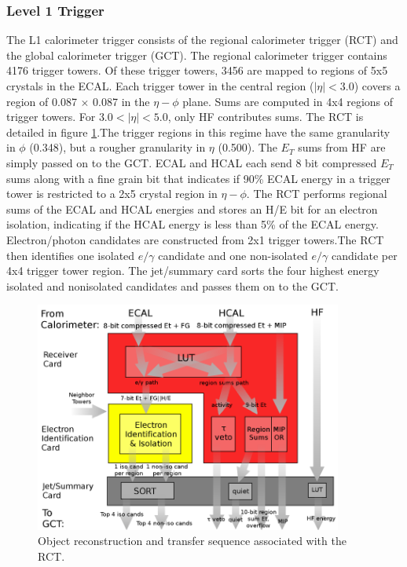 \documentclass[oneside, letterpaper, oldfontcommands]{memoir}
\begin{document}
\subsubsection{Level 1 Trigger}\label{L1trig}

\qquad The L1 calorimeter trigger consists of the regional calorimeter trigger (RCT) and the global calorimeter trigger (GCT). The regional calorimeter trigger contains 4176 trigger towers. Of these trigger towers, 3456 are mapped to regions of 5x5 crystals in the ECAL. Each trigger tower in the central region ($|\eta| < 3.0$) covers a region of 0.087 $\times$ 0.087 in the $\eta - \phi$ plane. Sums are computed in 4x4 regions of trigger towers. For $3.0 < |\eta| < 5.0$, only HF contributes sums. The RCT is detailed in figure \ref{fig:rct}.The trigger regions in this regime have the same granularity in $\phi$ (0.348), but a rougher granularity in $\eta$ (0.500). The $E_{T}$ sums from HF are simply passed on to the GCT. ECAL and HCAL each send 8 bit compressed $E_{T}$ sums along with a fine grain bit that indicates if 90\% ECAL energy in a trigger tower is restricted to a 2x5 crystal region in $\eta - \phi$. The RCT performs regional sums of the ECAL and HCAL energies and stores an H/E bit for an electron isolation, indicating if the HCAL energy is less than 5\% of the ECAL energy. Electron/photon candidates are constructed from 2x1 trigger towers.The RCT then identifies one isolated $e/\gamma$ candidate and one non-isolated $e/\gamma$ candidate per 4x4 trigger tower region. The jet/summary card sorts the four highest energy isolated and nonisolated candidates and passes them on to the GCT. 

\begin{figure}[here]
\includegraphics[width=0.9\textwidth]{rct.png}
\caption{Object reconstruction and transfer sequence associated with the RCT.}
\label{fig:rct}
\end{figure}
\end{document}
